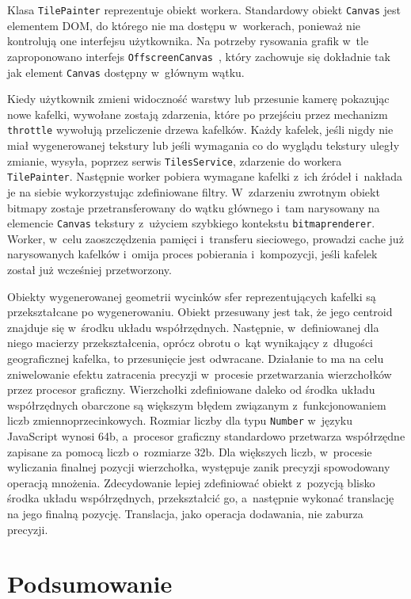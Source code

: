 Klasa \texttt{TilePainter} reprezentuje obiekt workera. Standardowy obiekt \texttt{Canvas} jest elementem DOM, do którego nie ma dostępu w~workerach, ponieważ nie kontrolują one interfejsu użytkownika. Na potrzeby rysowania grafik w~tle zaproponowano interfejs \texttt{OffscreenCanvas}~\cite{OffscreenCanvas}, który zachowuje się dokładnie tak jak element \texttt{Canvas} dostępny w~głównym wątku.

Kiedy użytkownik zmieni widoczność warstwy lub przesunie kamerę pokazując nowe kafelki, wywołane zostają zdarzenia, które po przejściu przez mechanizm \texttt{throttle} wywołują przeliczenie drzewa kafelków. Każdy kafelek, jeśli nigdy nie miał wygenerowanej tekstury lub jeśli wymagania co do wyglądu tekstury uległy zmianie, wysyła, poprzez serwis \texttt{TilesService}, zdarzenie do workera \texttt{TilePainter}. Następnie worker pobiera wymagane kafelki z~ich źródeł i~nakłada je na siebie wykorzystując zdefiniowane filtry. W~zdarzeniu zwrotnym obiekt bitmapy zostaje przetransferowany do wątku głównego i~tam narysowany na elemencie \texttt{Canvas} tekstury z~użyciem szybkiego kontekstu \texttt{bitmaprenderer}. Worker, w~celu zaoszczędzenia pamięci i~transferu sieciowego, prowadzi cache już narysowanych kafelków i~omija proces pobierania i~kompozycji, jeśli kafelek został już wcześniej przetworzony.

Obiekty wygenerowanej geometrii wycinków sfer reprezentujących kafelki są przekształcane po wygenerowaniu. Obiekt przesuwany jest tak, że jego centroid znajduje się w~środku układu współrzędnych. Następnie, w~definiowanej dla niego macierzy przekształcenia, oprócz obrotu o~kąt wynikający z~długości geograficznej kafelka, to przesunięcie jest odwracane. Działanie to ma na celu zniwelowanie efektu zatracenia precyzji w~procesie przetwarzania wierzchołków przez procesor graficzny. Wierzchołki zdefiniowane daleko od środka układu współrzędnych obarczone są większym błędem związanym z~funkcjonowaniem liczb zmiennoprzecinkowych. Rozmiar liczby dla typu \texttt{Number} w~języku JavaScript wynosi 64b, a~procesor graficzny standardowo przetwarza współrzędne zapisane za pomocą liczb o~rozmiarze 32b. Dla większych liczb, w~procesie wyliczania finalnej pozycji wierzchołka, występuje zanik precyzji spowodowany operacją mnożenia. Zdecydowanie lepiej zdefiniować obiekt z~pozycją blisko środka układu współrzędnych, przekształcić go, a~następnie wykonać translację na jego finalną pozycję. Translacja, jako operacja dodawania, nie zaburza precyzji.

\section{Podsumowanie}

